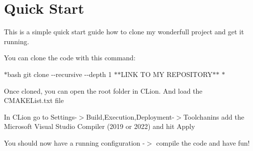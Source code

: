 \chapter{Quick Start }
\hypertarget{index}{}\label{index}
\label{index_md__quick_start}%
%


This is a simple quick start guide how to clone my wonderfull project and get it running.


\begin{DoxyEnumerate}
\item You can clone the code with this command\+:
\end{DoxyEnumerate}

\texorpdfstring{$\ast$}{*}{\ttfamily bash git clone -\/-\/recursive -\/-\/depth 1 \texorpdfstring{$\ast$}{*}\texorpdfstring{$\ast$}{*}\+LINK TO MY REPOSITORY\texorpdfstring{$\ast$}{*}\texorpdfstring{$\ast$}{*} \texorpdfstring{$\ast$}{*}}


\begin{DoxyEnumerate}
\item Once cloned, you can open the root folder in CLion. And load the {\ttfamily CMAKEList.\+txt} file
\item In CLion go to Settings-\/\texorpdfstring{$>$}{>}Build,Execution,Deployment-\/\texorpdfstring{$>$}{>}Toolchanins add the Microsoft Visual Studio Compiler (2019 or 2022) and hit Apply
\item You should now have a running configuration -\/\texorpdfstring{$>$}{>} compile the code and have fun! 
\end{DoxyEnumerate}